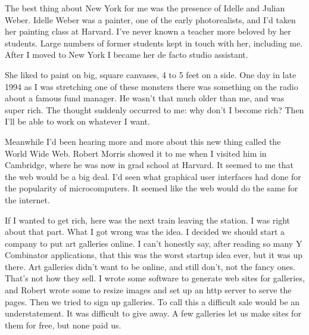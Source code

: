 The best thing about New York for me was the
                  presence of Idelle and Julian Weber. Idelle Weber was a
                  painter, one of the early photorealists, and I'd taken her
                  painting class at Harvard. I've never known a teacher more
                  beloved by her students. Large numbers of former students kept
                  in touch with her, including me. After I moved to New York I
                  became her de facto studio assistant.

She liked to
                  paint on big, square canvases, 4 to 5 feet on a side. One day
                  in late 1994 as I was stretching one of these monsters there
                  was something on the radio about a famous fund manager. He
                  wasn't that much older than me, and was super rich. The
                  thought suddenly occurred to me: why don't I become rich? Then
                  I'll be able to work on whatever I want.

Meanwhile
                  I'd been hearing more and more about this new thing called the
                  World Wide Web. Robert Morris showed it to me when I visited
                  him in Cambridge, where he was now in grad school at Harvard.
                  It seemed to me that the web would be a big deal. I'd seen
                  what graphical user interfaces had done for the popularity of
                  microcomputers. It seemed like the web would do the same for
                  the internet.

If I wanted to get rich, here was the
                  next train leaving the station. I was right about that part.
                  What I got wrong was the idea. I decided we should start a
                  company to put art galleries online. I can't honestly say,
                  after reading so many Y Combinator applications, that this was
                  the worst startup idea ever, but it was up there. Art
                  galleries didn't want to be online, and still don't, not the
                  fancy ones. That's not how they sell. I wrote some software to
                  generate web sites for galleries, and Robert wrote some to
                  resize images and set up an http server to serve the pages.
                  Then we tried to sign up galleries. To call this a difficult
                  sale would be an understatement. It was difficult to give
                  away. A few galleries let us make sites for them for free, but
                  none paid us.

